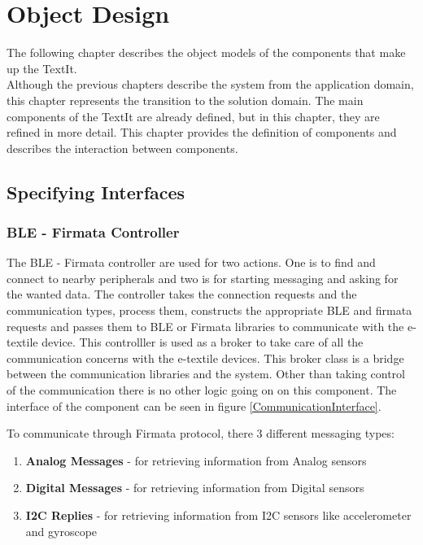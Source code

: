 \chapter{Object Design}

\def\ra{REST Adapter}
\def\et{Environment Tracker}
\def\fc{Fixture Controller}
\def\fr{Fixture Repository}
\def\dm{Decision Maker}
\def\aac{Authentication and Access Control}

The following chapter describes the object models of the components that make up the TextIt.\\
 
	Although the previous chapters describe the system from the application domain, this chapter represents the transition to the solution domain. The main components of the TextIt are already defined, but in this chapter, they are refined in more detail. This chapter provides the definition of components and describes the interaction between components. 

\section{Specifying Interfaces}
\subsection{BLE - Firmata Controller}
The BLE - Firmata controller are used for two actions. One is to find and connect to nearby peripherals and two is for starting messaging and asking for the wanted data. The controller takes the connection requests and the communication types, process them, constructs the appropriate BLE and firmata requests and passes them to BLE or Firmata libraries to communicate with the e-textile device. This controlller is used as a broker to take care of all the communication concerns with the e-textile devices. This broker class is a bridge between the communication libraries and the system. Other than taking control of the communication there is no other logic going on on this component. The interface of the component can be seen in figure \ref{CommunicationInterface}.


To communicate through Firmata protocol, there 3 different messaging types: 

\begin{enumerate}
\item \textbf{Analog Messages} - for retrieving information from Analog sensors
\item \textbf{Digital Messages} - for retrieving information from Digital sensors
\item \textbf{I2C Replies} - for retrieving information from I2C sensors like accelerometer and gyroscope
\end{enumerate}

